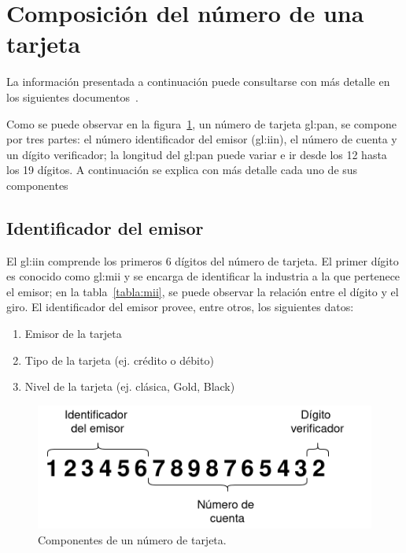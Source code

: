 %
%

\section{Composición del número de una tarjeta}

La información presentada a continuación puede consultarse con más detalle en
los siguientes documentos~\cite{iso_7812, iso_9362, pci_definitive_guide}.

Como se puede observar en la figura~\ref{figura:pan}, un número de tarjeta
\gls{gl:pan}, se compone por tres partes: el número identificador del emisor
(\gls{gl:iin}), el número de cuenta y un dígito verificador; la longitud del
\gls{gl:pan} puede variar e ir desde los 12 hasta los 19 dígitos. A
continuación se explica con más detalle cada uno de sus componentes

\subsection{Identificador del emisor}
El \gls{gl:iin} comprende los primeros 6 dígitos del número de
tarjeta. El primer dígito es conocido como \gls{gl:mii} y se encarga de
identificar la industria a la que pertenece el emisor; en la
tabla~\ref{tabla:mii}, se puede observar la relación entre el dígito y el giro.
El identificador del emisor provee, entre otros, los siguientes datos:

\begin{enumerate}
    \item Emisor de la tarjeta
    \item Tipo de la tarjeta (ej. crédito o débito)
    \item Nivel de la tarjeta (ej. clásica, Gold, Black)
\end{enumerate}

\begin{figure}
  \begin{center}
    \includegraphics[width=0.6\linewidth]{diagramas/tarjeta}
    \caption{Componentes de un número de tarjeta.}\label{figura:pan}
   \end{center}
\end{figure}

